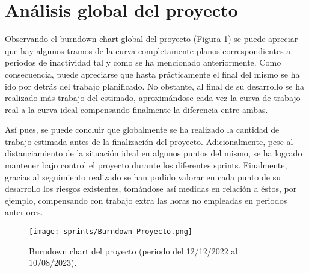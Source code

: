 \section{Análisis global del proyecto}

Observando el burndown chart global del proyecto (Figura \ref{fig:global}) se puede apreciar que hay algunos tramos de la curva completamente planos correspondientes a periodos de inactividad tal y como se ha mencionado anteriormente. Como consecuencia, puede apreciarse que hasta prácticamente el final del mismo se ha ido por detrás del trabajo planificado. No obstante, al final de su desarrollo se ha realizado más trabajo del estimado, aproximándose cada vez la curva de trabajo real a la curva ideal compensando finalmente la diferencia entre ambas.

Así pues, se puede concluir que globalmente se ha realizado la cantidad de trabajo estimada antes de la finalización del proyecto. Adicionalmente, pese al distanciamiento de la situación ideal en algunos puntos del mismo, se ha logrado mantener bajo control el proyecto durante los diferentes sprints. Finalmente, gracias al seguimiento realizado se han podido valorar en cada punto de su desarrollo los riesgos existentes, tomándose así medidas en relación a éstos, por ejemplo, compensando con trabajo extra las horas no empleadas en periodos anteriores.

\begin{figure}[H]
    \centering
    \texttt{[image: sprints/Burndown Proyecto.png]}
    \caption{Burndown chart del proyecto (periodo del 12/12/2022 al 10/08/2023).}
    \label{fig:global}
\end{figure}